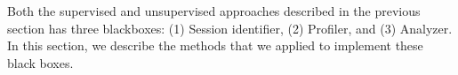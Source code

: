 

Both the supervised and unsupervised approaches described in the previous section has three blackboxes: (1) Session identifier, (2) Profiler, and (3) Analyzer. In this section, we describe the methods that we applied to implement these black boxes.













